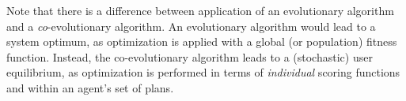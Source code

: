 Note that there is a difference between application of an evolutionary algorithm and a \emph{co}-evolutionary algorithm. An evolutionary algorithm would lead to a system optimum, as optimization is applied with a global (or population) fitness function. Instead, the co-evolutionary algorithm leads to a (stochastic) user \gls{equilibrium}, as optimization is performed in terms of \emph{individual} scoring functions and within an agent's set of plans. 
%

%
%
%
%
%
%
%
%
%

